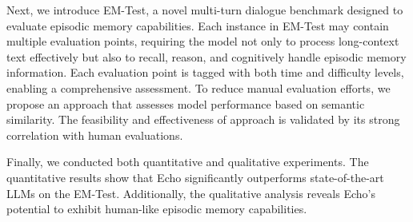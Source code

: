 Next, we introduce EM-Test, a novel multi-turn dialogue benchmark designed to evaluate episodic memory capabilities. Each instance in EM-Test may contain multiple evaluation points, requiring the model not only to process long-context text effectively but also to recall, reason, and cognitively handle episodic memory information. Each evaluation point is tagged with both time and difficulty levels, enabling a comprehensive assessment.
To reduce manual evaluation efforts, we propose an approach that assesses model performance based on semantic similarity. The feasibility and effectiveness of approach is validated by its strong correlation with human evaluations.

Finally, we conducted both quantitative and qualitative experiments. The quantitative results show that Echo significantly outperforms state-of-the-art LLMs on the EM-Test. Additionally, the qualitative analysis reveals Echo's potential to exhibit human-like episodic memory capabilities.

